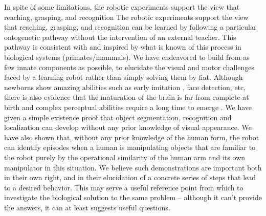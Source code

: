\ifrev
In spite of some limitations, the robotic experiments support the view that reaching, grasping, and recognition
\else
The robotic experiments support the view that reaching, grasping, and recognition
\fi
can be learned by following a particular ontogenetic pathway without the
intervention of an external teacher.
This pathway is consistent with and inspired by what is
known of this process in biological systems (primates/mammals).
%
We have endeavored to build from as few innate components as possible, to
elucidate the visual and motor challenges faced by a learning robot rather
than simply solving them by fiat.
%
Although newborns show amazing abilities \cite{spelke-2000} such as early imitation 
\cite{meltzoff-moore-1977}, face detection, etc, there is also evidence 
that the maturation of the brain is far from complete at birth and
complex perceptual abilities require a long time to emerge \cite{kovacs00human}.
%
We have given a simple existence proof that object segmentation,
recognition and localization can develop without any prior knowledge
of visual appearance.  We have also shown that, without any prior
knowledge of the human form, the robot can identify episodes when a
human is manipulating objects that are familiar to the robot purely by
the operational similarity of the human arm and its own manipulator in
this situation.  We believe such demonstrations are important both in
their own right, and in their elucidation of a concrete series of
steps that lead to a desired behavior.  This may serve a useful
reference point from which to investigate the biological solution to
the same problem -- although it can't provide the answers, it can at
least suggests useful questions.

%



